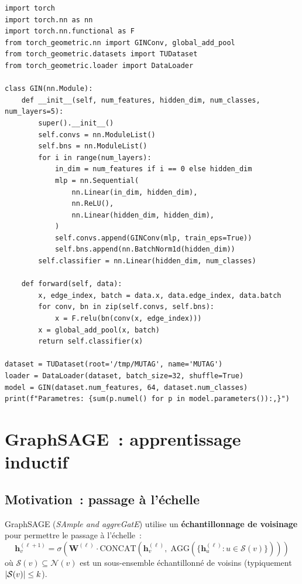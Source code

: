 \begin{codeblock}[title=\textbf{Impl\'ementation GIN}]
\begin{verbatim}
import torch
import torch.nn as nn
import torch.nn.functional as F
from torch_geometric.nn import GINConv, global_add_pool
from torch_geometric.datasets import TUDataset
from torch_geometric.loader import DataLoader

class GIN(nn.Module):
    def __init__(self, num_features, hidden_dim, num_classes, num_layers=5):
        super().__init__()
        self.convs = nn.ModuleList()
        self.bns = nn.ModuleList()
        for i in range(num_layers):
            in_dim = num_features if i == 0 else hidden_dim
            mlp = nn.Sequential(
                nn.Linear(in_dim, hidden_dim),
                nn.ReLU(),
                nn.Linear(hidden_dim, hidden_dim),
            )
            self.convs.append(GINConv(mlp, train_eps=True))
            self.bns.append(nn.BatchNorm1d(hidden_dim))
        self.classifier = nn.Linear(hidden_dim, num_classes)

    def forward(self, data):
        x, edge_index, batch = data.x, data.edge_index, data.batch
        for conv, bn in zip(self.convs, self.bns):
            x = F.relu(bn(conv(x, edge_index)))
        x = global_add_pool(x, batch)
        return self.classifier(x)

dataset = TUDataset(root='/tmp/MUTAG', name='MUTAG')
loader = DataLoader(dataset, batch_size=32, shuffle=True)
model = GIN(dataset.num_features, 64, dataset.num_classes)
print(f"Parametres: {sum(p.numel() for p in model.parameters()):,}")
\end{verbatim}
\end{codeblock}

\section{GraphSAGE~: apprentissage inductif}

\subsection{Motivation~: passage \`a l'\'echelle}

\begin{definition}
GraphSAGE (\textit{SAmple and aggreGatE}) utilise un \textbf{\'echantillonnage
de voisinage} pour permettre le passage \`a l'\'echelle~:
\[
    \mathbf{h}_v^{(\ell+1)} = \sigma\!\left(\mathbf{W}^{(\ell)} \cdot
    \text{CONCAT}\!\left(\mathbf{h}_v^{(\ell)},\;
    \text{AGG}(\{\mathbf{h}_u^{(\ell)} : u \in \mathcal{S}(v)\})\right)\right)
\]
o\`u $\mathcal{S}(v) \subseteq \mathcal{N}(v)$ est un sous-ensemble
\'echantillonn\'e de voisins (typiquement $\left| \mathcal{S}(v) \right| \leq k$).
\end{definition}

